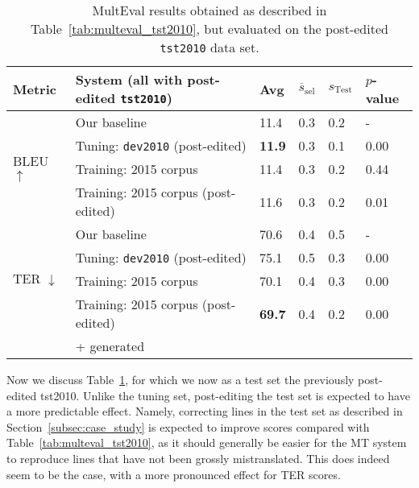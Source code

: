 {%
\begin{table}[htb]
\begin{center}
\begin{tabular}{|l|l|l|l|l|l|}
\hline
\bf Metric & \bf System (all with post-edited {\small \tt tst2010}) & \bf Avg & \bf $\overline{s}_{\text{sel}}$ & \bf $s_{\text{Test}}$ & \bf $p$-value \\
\hline
\multirow{4}{*}{BLEU $\uparrow$}
& Our baseline & 11.4 & 0.3 & 0.2 & - \\
& Tuning: {\small \tt dev2010} (post-edited) & \textbf{11.9} & 0.3 & 0.1 & 0.00 \\
& Training: 2015 corpus & 11.4 & 0.3 & 0.2 & 0.44 \\
& Training: 2015 corpus (post-edited) & 11.6 & 0.3 & 0.2 & 0.01 \\
\hline
\multirow{4}{*}{TER $\downarrow$}
& Our baseline & 70.6 & 0.4 & 0.5 & - \\
& Tuning: {\small \tt dev2010} (post-edited) & 75.1 & 0.5 & 0.3 & 0.00 \\
& Training: 2015 corpus & 70.1 & 0.4 & 0.3 & 0.00 \\
& Training: 2015 corpus (post-edited) & \textbf{69.7} & 0.4 & 0.2 & 0.00 \\
& + generated & & & &  \\
\hline
\end{tabular}
\end{center}

\caption{\label{tab:multeval_tst2010_fixed} %
MultEval results obtained as described in Table~\ref{tab:multeval_tst2010}, but evaluated on the post-edited {\small \tt tst2010} data set.
} %
\end{table}

Now we discuss Table~\ref{tab:multeval_tst2010_fixed}, for which we now as a test set the previously post-edited tst2010.
Unlike the tuning set, post-editing the test set is expected to have a more predictable effect.
Namely, correcting lines in the test set as described in Section~\ref{subsec:case_study} is expected to improve scores compared with Table~\ref{tab:multeval_tst2010}, as it should generally be easier for the MT system to reproduce lines that have not been grossly mistranslated.
This does indeed seem to be the case, with a more pronounced effect for TER scores.%

}
